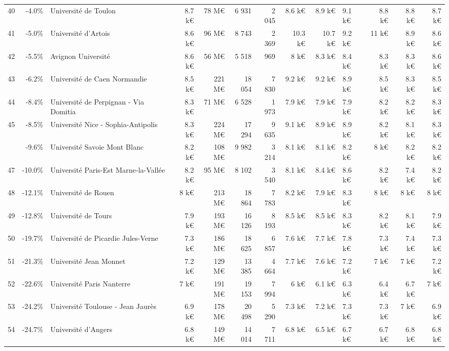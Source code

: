 \documentclass[12pt,french,landscape]{article}
\begin{document}
\begin{longtable}{rrlrrrrrrlrrr}
40 & -4.0\% & Université de Toulon & 8.7 k€ & 78 M€ & 6 931 & 2 045 & 8.6 k€ & 8.9 k€ & 9.1 k€ & 8.8 k€ & 8.8 k€ & 8.7 k€\\
\addlinespace
\rowcolor{gray!6}  41 & -5.0\% & Université d'Artois & 8.6 k€ & 96 M€ & 8 743 & 2 369 & 10.3 k€ & 10.7 k€ & 9.2 k€ & 11 k€ & 8.9 k€ & 8.6 k€\\
42 & -5.5\% & Avignon Université & 8.6 k€ & 56 M€ & 5 518 & 969 & 8 k€ & 8.3 k€ & 8.4 k€ & 8.3 k€ & 8.3 k€ & 8.6 k€\\
\rowcolor{gray!6}  43 & -6.2\% & Université de Caen Normandie & 8.5 k€ & 221 M€ & 18 054 & 7 830 & 9.2 k€ & 9.2 k€ & 8.9 k€ & 8.5 k€ & 8.3 k€ & 8.5 k€\\
44 & -8.4\% & Université de Perpignan - Via Domitia & 8.3 k€ & 71 M€ & 6 528 & 1 973 & 7.9 k€ & 7.9 k€ & 7.9 k€ & 8.2 k€ & 8.2 k€ & 8.3 k€\\
\rowcolor{gray!6}  45 & -8.5\% & Université Nice - Sophia-Antipolis & 8.3 k€ & 224 M€ & 17 294 & 9 635 & 9.1 k€ & 8.9 k€ & 8.9 k€ & 8.2 k€ & 8.1 k€ & 8.3 k€\\
\addlinespace
46 & -9.6\% & Université Savoie Mont Blanc & 8.2 k€ & 108 M€ & 9 982 & 3 214 & 8.1 k€ & 8.1 k€ & 8.2 k€ & 8 k€ & 8.2 k€ & 8.2 k€\\
\rowcolor{gray!6}  47 & -10.0\% & Université Paris-Est Marne-la-Vallée & 8.2 k€ & 95 M€ & 8 102 & 3 540 & 8.1 k€ & 8.4 k€ & 8.6 k€ & 8.2 k€ & 7.4 k€ & 8.2 k€\\
48 & -12.1\% & Université de Rouen & 8 k€ & 213 M€ & 18 864 & 7 783 & 8.2 k€ & 7.9 k€ & 8.3 k€ & 8 k€ & 8 k€ & 8 k€\\
\rowcolor{gray!6}  49 & -12.8\% & Université de Tours & 7.9 k€ & 193 M€ & 16 126 & 8 193 & 8.5 k€ & 8.5 k€ & 8.3 k€ & 8.2 k€ & 8.1 k€ & 7.9 k€\\
50 & -19.7\% & Université de Picardie Jules-Verne & 7.3 k€ & 186 M€ & 18 625 & 6 857 & 7.6 k€ & 7.7 k€ & 7.8 k€ & 7.3 k€ & 7.4 k€ & 7.3 k€\\
\addlinespace
\rowcolor{gray!6}  51 & -21.3\% & Université Jean Monnet & 7.2 k€ & 129 M€ & 13 385 & 4 664 & 7.7 k€ & 7.6 k€ & 7.2 k€ & 7 k€ & 7 k€ & 7.2 k€\\
52 & -22.6\% & Université Paris Nanterre & 7 k€ & 191 M€ & 19 153 & 7 994 & 6 k€ & 6.1 k€ & 6.3 k€ & 6.4 k€ & 6.7 k€ & 7 k€\\
\rowcolor{gray!6}  53 & -24.2\% & Université Toulouse - Jean Jaurès & 6.9 k€ & 178 M€ & 20 498 & 5 290 & 7.3 k€ & 7.2 k€ & 7.3 k€ & 7.3 k€ & 7 k€ & 6.9 k€\\
54 & -24.7\% & Université d'Angers & 6.8 k€ & 149 M€ & 14 014 & 7 711 & 6.8 k€ & 6.5 k€ & 6.7 k€ & 6.7 k€ & 6.8 k€ & 6.8 k€\\

\end{longtable}
\end{document}
